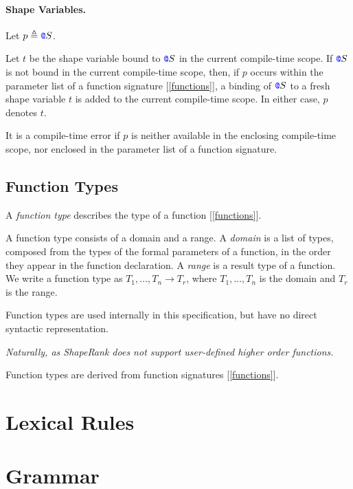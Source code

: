 \documentclass{article}
\begin{document}
 \paragraph{Shape Variables.}


 Let $p \triangleq \texttt{\color{blue} @}{}{}S$.
 
 Let $t$ be the shape variable bound to  $\texttt{\color{blue} @}{}{}S$ in the current compile-time scope. If $\texttt{\color{blue} @}{}{}S$ is not bound in the current compile-time scope, then, if $p$ occurs within the parameter list of a function signature [\ref{functions}],  a binding of  $\texttt{\color{blue} @}{}{}S$ to a fresh shape variable $t$ is added to the current compile-time scope. In either case, $p$ denotes  $t$. 
 
 It is a compile-time error if $p$ is neither available in the enclosing compile-time scope, nor enclosed in the parameter list of a function signature.
 

 
\subsection{Function Types}
\label{functionTypes}

A {\em function type} describes the type of a function [\ref{functions}].

A function type consists of a domain and a range. A {\em domain} is a list of types, composed from the types of the formal parameters of a function, in the order they appear in the function declaration. A {\em range} is a result type of a function. 
We write a  function type as $T_1, \ldots, T_n \to T_r$, where $T_1, \ldots, T_n$ is the domain and $T_r$ is the range.

Function types are used internally in this specification, but have no direct syntactic representation.

{\em 
Naturally, as ShapeRank does not support user-defined higher order functions.

Function types  are derived from function signatures [\ref{functions}].
}



\section{Lexical Rules}
\label{lexicalRules}
\printlexitable

\section{Grammar}
\label{grammar}
\printgrammartable
\end{document}
